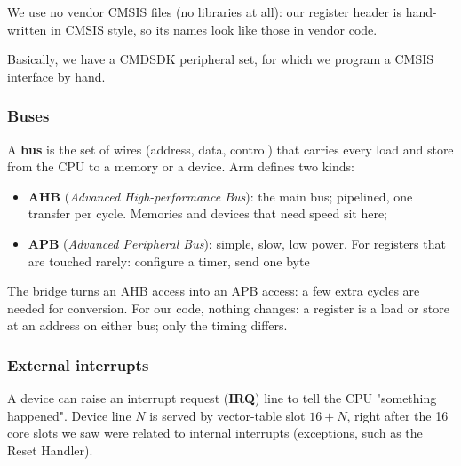 \documentclass[a4paper,11pt]{article}
\begin{document}
We use no vendor CMSIS files (no libraries at all): our register header is hand-written in CMSIS style, so its
names look like those in vendor code.

Basically, we have a CMDSDK peripheral set, for which we program a CMSIS interface by hand.

\subsubsection{Buses}

A \textbf{bus} is the set of wires (address, data, control) that carries every load and store from the CPU to a memory or a
device. Arm defines two kinds:

\begin{itemize}
	\item \textbf{AHB} (\textit{Advanced High-performance Bus}): the main bus; pipelined, one transfer per cycle. Memories and devices
	      that need speed sit here;
	\item \textbf{APB} (\textit{Advanced Peripheral Bus}): simple, slow, low power. For registers that are touched rarely: configure a
	      timer, send one byte
\end{itemize}

The bridge turns an AHB access into an APB access: a few extra cycles are needed for conversion.
For our code, nothing changes: a register is a load or store at an address on either bus; only the timing differs.

\subsubsection{External interrupts}

A device can raise an interrupt request (\textbf{IRQ}) line to tell the CPU "something happened". Device line $N$ is served by vector-table slot $16 + N$, right after the 16 core slots we saw were related to internal interrupts (exceptions, such as the Reset Handler).
\end{document}
